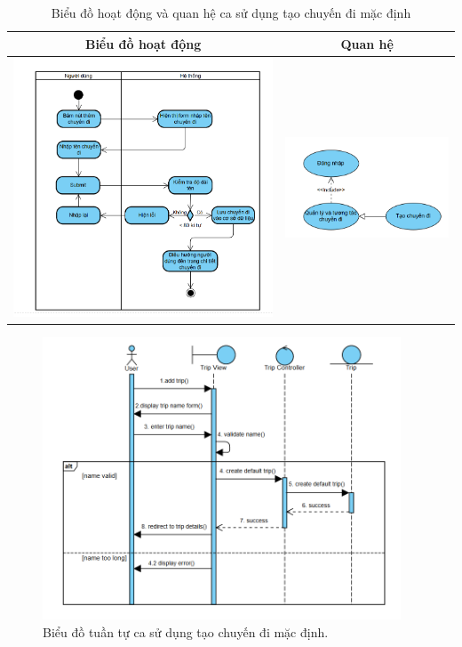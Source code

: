 \begin{table}[H] %
    \centering
    \caption{Biểu đồ hoạt động và quan hệ ca sử dụng tạo chuyến đi mặc định} %
    \label{tab:uc_create_default_trip_diagrams} %
    \begin{tabular}{| c | c |}
        \hline
        \textbf{Biểu đồ hoạt động} & \textbf{Quan hệ} \\
        \hline
        \includegraphics[width=0.5\linewidth]{figures/c3/3-3-11-ad.png} %
        &
        \includegraphics[width=0.45\linewidth]{figures/c3/3-3-11-rd.png} \\ %
        \hline
    \end{tabular}
\end{table}

\begin{figure}[H]
    \centering
    \includegraphics[width=0.95\textwidth]{figures/c3/3-3-11-sd.png} %
    \caption{Biểu đồ tuần tự ca sử dụng tạo chuyến đi mặc định.}
    \label{fig:3-3-11-sequence-diagram}
\end{figure}